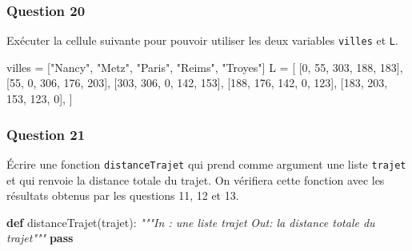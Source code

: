 \documentclass[
  paper=a4,
  ,captions=tableheading
]{scrartcl}
\newenvironment{Shaded}{}{}
\newcommand{\CommentTok}[1]{\textcolor[rgb]{0.38,0.63,0.69}{\textit{#1}}}
\newcommand{\ControlFlowTok}[1]{\textcolor[rgb]{0.00,0.44,0.13}{\textbf{#1}}}
\newcommand{\DecValTok}[1]{\textcolor[rgb]{0.25,0.63,0.44}{#1}}
\newcommand{\KeywordTok}[1]{\textcolor[rgb]{0.00,0.44,0.13}{\textbf{#1}}}
\newcommand{\NormalTok}[1]{#1}
\newcommand{\OperatorTok}[1]{\textcolor[rgb]{0.40,0.40,0.40}{#1}}
\newcommand{\StringTok}[1]{\textcolor[rgb]{0.25,0.44,0.63}{#1}}
\begin{document}
\hypertarget{question-20}{%
\subsubsection{Question 20}\label{question-20}}

Exécuter la cellule suivante pour pouvoir utiliser les deux variables
\texttt{villes} et \texttt{L}.

\begin{Shaded}
\begin{Highlighting}[]
\NormalTok{villes }\OperatorTok{=}\NormalTok{ [}\StringTok{"Nancy"}\NormalTok{, }\StringTok{"Metz"}\NormalTok{, }\StringTok{"Paris"}\NormalTok{, }\StringTok{"Reims"}\NormalTok{, }\StringTok{"Troyes"}\NormalTok{]}
\NormalTok{L }\OperatorTok{=}\NormalTok{ [}
\NormalTok{    [}\DecValTok{0}\NormalTok{, }\DecValTok{55}\NormalTok{, }\DecValTok{303}\NormalTok{, }\DecValTok{188}\NormalTok{, }\DecValTok{183}\NormalTok{],}
\NormalTok{    [}\DecValTok{55}\NormalTok{, }\DecValTok{0}\NormalTok{, }\DecValTok{306}\NormalTok{, }\DecValTok{176}\NormalTok{, }\DecValTok{203}\NormalTok{],}
\NormalTok{    [}\DecValTok{303}\NormalTok{, }\DecValTok{306}\NormalTok{, }\DecValTok{0}\NormalTok{, }\DecValTok{142}\NormalTok{, }\DecValTok{153}\NormalTok{],}
\NormalTok{    [}\DecValTok{188}\NormalTok{, }\DecValTok{176}\NormalTok{, }\DecValTok{142}\NormalTok{, }\DecValTok{0}\NormalTok{, }\DecValTok{123}\NormalTok{],}
\NormalTok{    [}\DecValTok{183}\NormalTok{, }\DecValTok{203}\NormalTok{, }\DecValTok{153}\NormalTok{, }\DecValTok{123}\NormalTok{, }\DecValTok{0}\NormalTok{],}
\NormalTok{]}
\end{Highlighting}
\end{Shaded}

\hypertarget{question-21}{%
\subsubsection{Question 21}\label{question-21}}

Écrire une fonction \texttt{distanceTrajet} qui prend comme argument une
liste \texttt{trajet} et qui renvoie la distance totale du trajet. On
vérifiera cette fonction avec les résultats obtenus par les questions
11, 12 et 13.

\begin{Shaded}
\begin{Highlighting}[]
\KeywordTok{def}\NormalTok{ distanceTrajet(trajet):}
    \CommentTok{"""In : une liste trajet}
\CommentTok{    Out: la distance totale du trajet"""}
    \ControlFlowTok{pass}
\end{Highlighting}
\end{Shaded}
\end{document}
